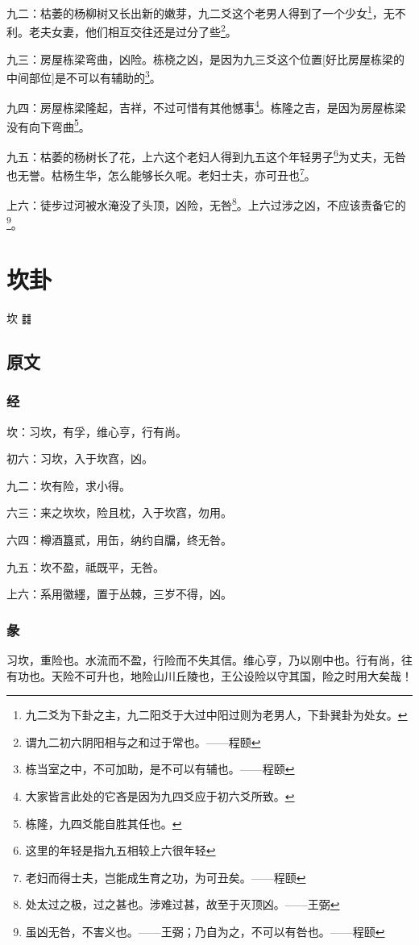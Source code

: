 \documentclass[12pt,oneside]{book}
\begin{document}
九二：枯萎的杨柳树又长出新的嫩芽，九二爻这个老男人得到了一个少女\footnote{九二爻为下卦之主，九二阳爻于大过中阳过则为老男人，下卦巽卦为处女。}，无不利。老夫女妻，他们相互交往还是过分了些\footnote{谓九二初六阴阳相与之和过于常也。——程颐}。

九三：房屋栋梁弯曲，凶险。栋桡之凶，是因为九三爻这个位置[好比房屋栋梁的中间部位]是不可以有辅助的\footnote{栋当室之中，不可加助，是不可以有辅也。——程颐}。

九四：房屋栋梁隆起，吉祥，不过可惜有其他憾事\footnote{大家皆言此处的它吝是因为九四爻应于初六爻所致。}。栋隆之吉，是因为房屋栋梁没有向下弯曲\footnote{栋隆，九四爻能自胜其任也。}。

九五：枯萎的杨树长了花，上六这个老妇人得到九五这个年轻男子\footnote{这里的年轻是指九五相较上六很年轻}为丈夫，无咎也无誉。枯杨生华，怎么能够长久呢。老妇士夫，亦可丑也\footnote{老妇而得士夫，岂能成生育之功，为可丑矣。——程颐}。

上六：徒步过河被水淹没了头顶，凶险，无咎\footnote{处太过之极，过之甚也。涉难过甚，故至于灭顶凶。——王弼}。上六过涉之凶，不应该责备它的\footnote{虽凶无咎，不害义也。——王弼；乃自为之，不可以有咎也。——程颐}。


\chapter{坎卦}
坎 {\Large ䷜}

\section{原文}

\subsection{经}
坎：习坎，有孚，维心亨，行有尚。

初六：习坎，入于坎窞，凶。

九二：坎有险，求小得。

六三：来之坎坎，险且枕，入于坎窞，勿用。

六四：樽酒簋贰，用缶，纳约自牖，终无咎。

九五：坎不盈，祗既平，无咎。

上六：系用徽纆，置于丛棘，三岁不得，凶。

\subsection{彖}
习坎，重险也。水流而不盈，行险而不失其信。维心亨，乃以刚中也。行有尚，往有功也。天险不可升也，地险山川丘陵也，王公设险以守其国，险之时用大矣哉！
\end{document}
